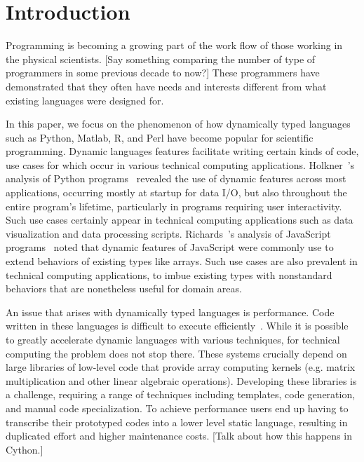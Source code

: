 \section{Introduction}
Programming is becoming a growing part of the work flow of those working in the physical scientists. [Say something comparing the number of type of programmers in some previous decade to now?] These programmers have demonstrated that they often have needs and interests different from what existing languages were designed for.

In this paper, we focus on the phenomenon of how dynamically typed languages such as Python, Matlab, R, and Perl have become popular for scientific programming. Dynamic languages features facilitate writing certain kinds of code, use cases for which occur in various technical computing applications.
Holkner~\etal's analysis of Python programs~\cite{Holkner2009} revealed the use of dynamic
features across most applications, occurring mostly at startup for data I/O, but
also throughout the entire program's lifetime, particularly in programs
requiring user interactivity. Such use cases certainly appear in technical
computing applications such as data visualization and data processing scripts.
Richards~\etal's analysis of JavaScript programs~\cite{Richards2010} noted that dynamic
features of JavaScript were commonly use to extend behaviors of existing types
like arrays. Such use cases are also prevalent in technical computing
applications, to imbue existing types with nonstandard behaviors that are
nonetheless useful for domain areas.

An issue that arises with dynamically typed languages is performance.
Code written in these languages is difficult to execute efficiently~\cite{Joisha2001,Joisha2006,Seljebotn2009}.
While it is possible
to greatly accelerate dynamic languages with various techniques, for
technical computing the problem does not stop there. These systems
crucially depend on large libraries of low-level code that provide array
computing kernels (e.g. matrix multiplication and other linear algebraic
operations). Developing these libraries is a challenge, requiring a range of
techniques including templates, code generation, and manual code
specialization. To achieve performance users end up having to transcribe their prototyped codes into a lower level static language, resulting in duplicated effort and higher maintenance costs. [Talk about how this happens in Cython.]


